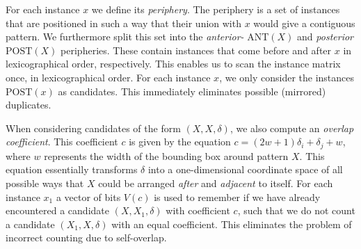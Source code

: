 \documentclass{llncs}
\begin{document}
For each instance $x$ we define its \emph{periphery}. The periphery is a set of instances that are positioned in such a way that their union with $x$ would give a contiguous pattern. We furthermore split this set into the \emph{anterior-} $\mathrm{ANT}(X)$ and \emph{posterior} $\mathrm{POST}(X)$ peripheries. These contain instances that come before and after $x$ in lexicographical order, respectively. This enables us to scan the instance matrix once, in lexicographical order. For each instance $x$, we only consider the instances $\mathrm{POST}(x)$ as candidates. This immediately eliminates possible (mirrored) duplicates. 



When considering candidates of the form $(X,X,\delta)$, we also compute an \emph{overlap coefficient}. This coefficient $c$ is given by the equation $c = (2w+1)\delta_i + \delta_j + w$, where $w$ represents the width of the bounding box around pattern $X$. This equation essentially transforms $\delta$ into a one-dimensional coordinate space of all possible ways that $X$ could be arranged \emph{after} and \emph{adjacent} to itself. For each instance $x_1$ a vector of bits $V(c)$ is used to remember if we have already encountered a candidate $(X,X_1,\delta)$ with coefficient $c$, such that we do not count a candidate $(X_1,X,\delta)$ with an equal coefficient. This eliminates the problem of incorrect counting due to self-overlap.
\end{document}
